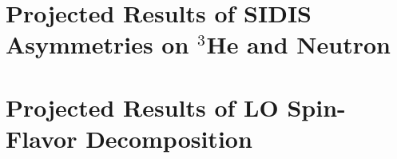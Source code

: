 \documentclass[11pt]{report}
\begin{document}
\chapter{Projected Results of SIDIS Asymmetries on $^3$He and Neutron}

\chapter{Projected Results of LO Spin-Flavor Decomposition}
\label{App:spin_flavor}
 

%
%
%
\clearpage
{}
{}

%
%
%


{}


\end{document}
